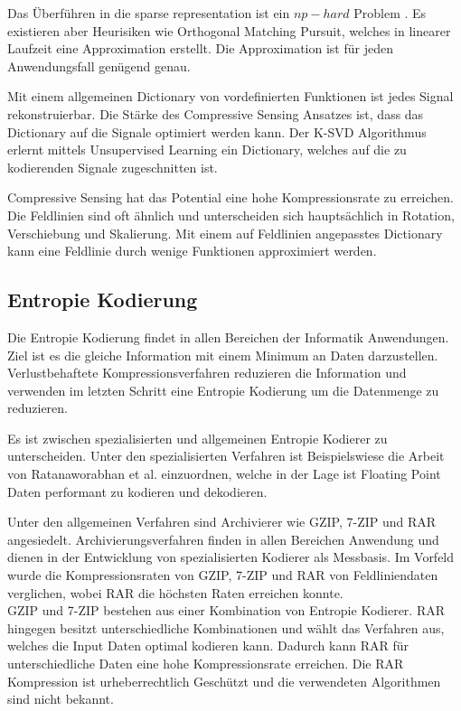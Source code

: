 Das Überführen in die sparse representation ist ein $np-hard$ Problem \cite{wiki:npHard}. Es existieren aber Heurisiken wie Orthogonal Matching Pursuit\cite{tropp2007signal}, welches in linearer Laufzeit eine Approximation erstellt. Die Approximation ist für jeden Anwendungsfall genügend genau.

Mit einem allgemeinen Dictionary von vordefinierten Funktionen ist jedes Signal rekonstruierbar. Die Stärke des Compressive Sensing Ansatzes ist, dass das Dictionary auf die Signale optimiert werden kann. Der K-SVD \cite{bryt2008compression} Algorithmus erlernt mittels Unsupervised Learning ein Dictionary, welches auf die zu kodierenden Signale zugeschnitten ist. 

Compressive Sensing hat das Potential eine hohe Kompressionsrate zu erreichen. Die Feldlinien sind oft ähnlich und unterscheiden sich hauptsächlich in Rotation, Verschiebung und Skalierung. Mit einem auf Feldlinien angepasstes Dictionary kann eine Feldlinie durch wenige Funktionen approximiert werden.

\subsection{Entropie Kodierung}
Die Entropie Kodierung findet in allen Bereichen der Informatik Anwendungen. Ziel ist es die gleiche Information mit einem Minimum an Daten darzustellen. Verlustbehaftete Kompressionsverfahren reduzieren die Information und verwenden im letzten Schritt eine Entropie Kodierung um die Datenmenge zu reduzieren.

Es ist zwischen spezialisierten und allgemeinen Entropie Kodierer zu unterscheiden. Unter den spezialisierten Verfahren ist Beispielswiese die Arbeit von Ratanaworabhan et al.\cite{ratanaworabhan2006fast} einzuordnen, welche in der Lage ist Floating Point Daten performant zu kodieren und dekodieren.
 
Unter den allgemeinen Verfahren sind Archivierer wie GZIP\cite{website:gzip}, 7-ZIP\cite{website:7zip} und RAR\cite{website:rar} angesiedelt. Archivierungsverfahren finden in allen Bereichen Anwendung und dienen in der Entwicklung von spezialisierten Kodierer als Messbasis. Im Vorfeld wurde die Kompressionsraten von GZIP, 7-ZIP und RAR von Feldliniendaten verglichen, wobei RAR die höchsten Raten erreichen konnte.\\
GZIP und 7-ZIP bestehen aus einer Kombination von Entropie Kodierer. RAR hingegen besitzt unterschiedliche Kombinationen und wählt das Verfahren aus, welches die Input Daten optimal kodieren kann. Dadurch kann RAR für unterschiedliche Daten eine hohe Kompressionsrate erreichen. Die RAR Kompression ist urheberrechtlich Geschützt und die verwendeten Algorithmen sind nicht bekannt.
